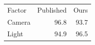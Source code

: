 \begin{tabular}{lrr}
Factor & Published & Ours \\
Camera & 96.8 & 93.7 \\
Light & 94.9 & 96.5 \\
\end{tabular}
